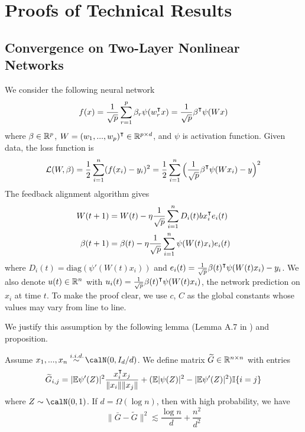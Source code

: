 \section{Proofs of Technical Results}

\subsection{Convergence on Two-Layer Nonlinear Networks}
We consider the following neural network
\begin{equation}
f(x) = \frac{1}{\sqrt p}\sum_{r=1}^p \beta_r \psi(w_r\transpose x) = \frac{1}{\sqrt p}\beta\transpose \psi(Wx)
\end{equation}
where $\beta \in \mathbb{R}^p$, $W = (w_1,...,w_p)\transpose\in\R^{p\times d}$, and $\psi$ is activation function. Given data, the loss function is 
\begin{equation}
\Loss(W, \beta) = \frac{1}{2}\sum_{i=1}^n(f(x_i)-y_i)^2 = \frac{1}{2}\sum_{i=1}^n\Big(\frac{1}{\sqrt p}\beta\transpose \psi(Wx_i)-y\Big)^2
\end{equation}
The feedback alignment algorithm gives
\begin{equation}
\label{eq:updates}
\begin{aligned}
    W(t+1) &= W(t) - \eta\frac{1}{\sqrt p}\sum_{i=1}^nD_i(t)bx_i\transpose e_i(t) \\
    \beta(t+1) &= \beta(t)- \eta \frac{1}{\sqrt p}\sum_{i=1}^n \psi(W(t)x_i)e_i(t)
\end{aligned}
\end{equation}
where $D_i(t) = \text{diag}(\psi'(W(t)x_i))$ and $e_i(t) = \frac{1}{\sqrt p}\beta(t)\transpose \psi(W(t)x_i)-y_i$. We also denote $u(t)\in\mathbb{R}^n$ with $u_i(t) = \frac{1}{\sqrt p}\beta(t)\transpose \psi(W(t)x_i)$, the network prediction on $x_i$ at time $t$. To make the proof clear, we use $c$, $C$ as the global constants whose values may vary from line to line.



We justify this assumption by the following lemma (Lemma A.7 in \citep{gao2020model}) and proposition.
\begin{lemma}\label{lma:G}
Assume $x_1,...,x_n \overset{\iid}{\sim} \calN(0,I_d/d)$. We define  matrix $\widetilde{G}\in \mathbb{R}^{n\times n}$ with entries
\begin{equation*}
    \widetilde{G}_{i,j} = |\E\psi'(Z)|^2 \frac{x_i\transpose x_j}{\|x_i\|\|x_j\|} + (\E|\psi(Z)|^2-|\E\psi'(Z)|^2)\I\{i=j\}
\end{equation*}
where $Z\sim \calN(0,1)$. If $d = \Omega(\log n)$, then with high probability, we have
\begin{equation*}
\|\bar{G}-\widetilde{G}\|^2 \lesssim \frac{\log n}{d} + \frac{n^2}{d^2}
\end{equation*}
\end{lemma}


